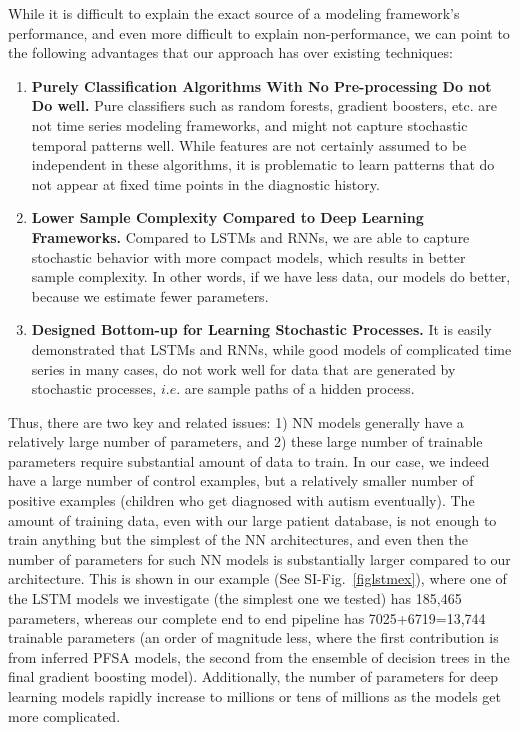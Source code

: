 \documentclass[onecolumn,,10pt]{IEEEtran}
\begin{document}
  While it is difficult to explain the exact source of a modeling framework's performance, and even more difficult to explain  non-performance, we can point to the following advantages that our approach has over existing techniques:
  \begin{enumerate}
    \item \textbf{Purely Classification Algorithms With No Pre-processing Do not Do well.} Pure classifiers such as random forests, gradient boosters, etc. are not time series modeling frameworks, and might not capture stochastic temporal patterns well. While features are not certainly assumed to be independent in these algorithms, it is problematic to learn patterns that do not appear at fixed time points in the diagnostic history.
  \item \textbf{Lower Sample Complexity Compared to Deep Learning Frameworks.} Compared to LSTMs and RNNs, we are able to capture stochastic behavior with more compact models, which results in  better sample complexity. In other words, if we have less data, our models do better, because we estimate fewer parameters.
  \item \textbf{Designed Bottom-up for Learning Stochastic Processes.} It is easily demonstrated that LSTMs and RNNs, while good models of complicated time series in many cases, do not work well for data that are generated by stochastic processes, $i.e.$ are sample paths of a hidden process.
  \end{enumerate}

  
  Thus, there are two key and related issues: 1) NN models generally have a relatively large number of parameters, and 2) these large number of trainable parameters require substantial amount of data to train. In our case, we indeed have a large number of control examples, but a relatively smaller number of positive examples (children who get diagnosed with autism eventually). The amount of training data, even with our large patient database, is not enough to train anything but the simplest of the NN architectures, and even then the number of parameters for such NN models is substantially larger compared to our architecture. This is shown in our example (See SI-Fig.~\ref{figlstmex}), where one of the LSTM models we investigate (the simplest one we tested) has 185,465 parameters, whereas our complete end to end pipeline has 7025+6719=13,744 trainable parameters (an order of magnitude less, where the first contribution is from inferred PFSA models, the second from the ensemble of decision trees in the final gradient boosting model). Additionally, the number of parameters for deep learning models rapidly increase to millions or tens of millions as the models get more complicated.
\end{document}
